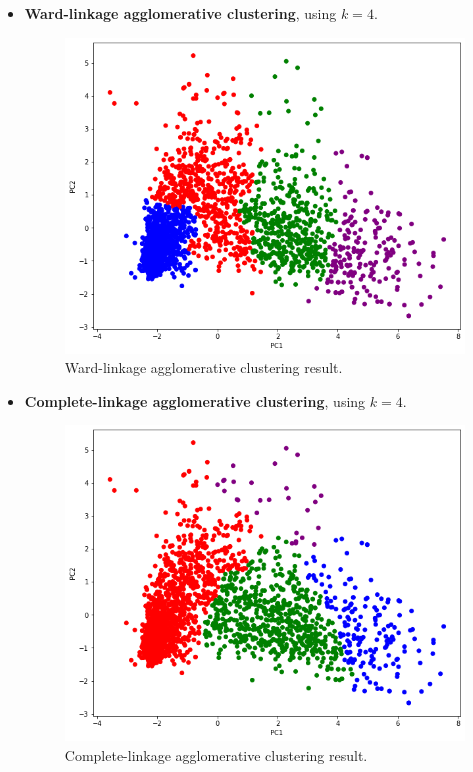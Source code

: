 \documentclass[11pt]{article}
\begin{document}
\begin{itemize}
\newpage

\item \textbf{Ward-linkage agglomerative clustering}, using $k=4$.

\begin{figure}[h!]
\centerline{\includegraphics[scale=0.5]{clu_8.png}}
\caption{Ward-linkage agglomerative clustering result.}
\end{figure}

\item \textbf{Complete-linkage agglomerative clustering}, using $k=4$.

\begin{figure}[h!]
\centerline{\includegraphics[scale=0.5]{clu_9.png}}
\caption{Complete-linkage agglomerative clustering result.}
\end{figure}


\end{itemize}
\end{document}
